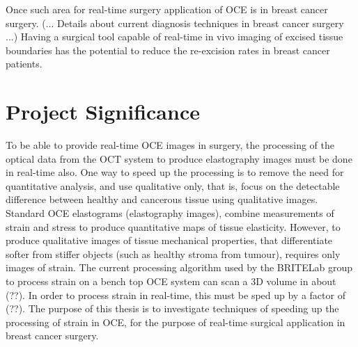 Once such area for real-time surgery application of OCE is in breast cancer surgery. (... Details about current diagnosis techniques in breast cancer surgery ...) Having a surgical tool capable of real-time in vivo imaging of excised tissue boundaries has the potential to reduce the re-excision rates in breast cancer patients.

\section{Project Significance}
To be able to provide real-time OCE images in surgery, the processing of the optical data from the OCT system to produce elastography images must be done in real-time also. One way to speed up the processing is to remove the need for quantitative analysis, and use qualitative only, that is, focus on the detectable difference between healthy and cancerous tissue using qualitative images. Standard OCE elastograms (elastography images), combine measurements of strain and stress to produce quantitative maps of tissue elasticity. However, to produce qualitative images of tissue mechanical properties, that differentiate softer from stiffer objects (such as healthy stroma from tumour), requires only images of strain. 
The current processing algorithm used by the BRITELab group to process strain on a bench top OCE system can scan a 3D volume in about (??). In order to process strain in real-time, this must be sped up by a factor of (??). The purpose of this thesis is to investigate techniques of speeding up the processing of strain in OCE, for the purpose of real-time surgical application in breast cancer surgery.
